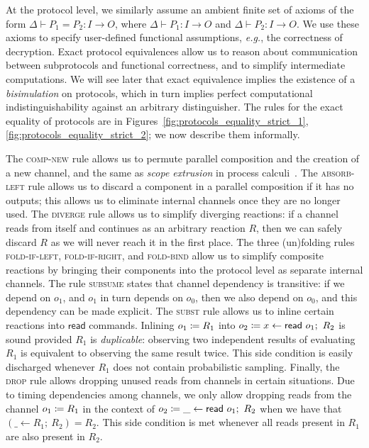 At the protocol level, we similarly assume an ambient finite set of axioms of the form $\Delta \vdash P_1 = P_2 : I \to O$, where $\Delta \vdash P_1 : I \to O$ and $\Delta \vdash P_2 : I \to O$. We use these axioms to specify user-defined functional assumptions, \emph{e.g.}, the correctness of decryption. Exact protocol equivalences allow us to reason about communication between subprotocols and functional correctness, and to simplify intermediate computations. We will see later that exact equivalence implies the existence of a \emph{bisimulation} on protocols, which in turn implies perfect computational indistinguishability against an arbitrary distinguisher. The rules for the exact equality of protocols are in Figures~\ref{fig:protocols_equality_strict_1}, \ref{fig:protocols_equality_strict_2}; we now describe them informally.

The \textsc{comp-new} rule allows us to permute parallel composition and the creation of a new channel, and the same as \emph{scope
extrusion} in process calculi~\cite{picalc}. The \textsc{absorb-left} 
rule allows us to discard a component in a parallel composition if it has no outputs; this allows us to eliminate internal channels once they are no longer used. The \textsc{diverge} rule allows us to simplify diverging reactions: if a channel reads from itself and continues as an arbitrary reaction $R$, then we can safely discard $R$ as we will never reach it in the first place. The three (un)folding rules \textsc{fold-if-left}, \textsc{fold-if-right}, and \textsc{fold-bind} allow us to simplify composite reactions by bringing their
components into the protocol level as separate internal channels. The rule \textsc{subsume} states that channel dependency is transitive: if we depend on $o_1$, and $o_1$ in turn depends on $o_0$, then we also depend on $o_0$, and this dependency can be made explicit. The \textsc{subst} rule allows us to inline certain reactions into $\mathsf{read}$ commands. Inlining $o_1 \coloneqq R_1$ into $\assign{o_2}{x \leftarrow \read{o_1}; \ R_2}$ is sound provided $R_1$ is \emph{duplicable}: observing two independent results of evaluating $R_1$ is equivalent to observing the same result twice. This side condition is easily discharged whenever $R_1$ does not contain probabilistic
sampling. Finally, the \textsc{drop} rule allows dropping unused reads from channels in certain situations. Due to timing dependencies among channels, we only allow dropping reads from the channel $o_1 \coloneqq R_1$ in the context of $\assign{o_2}{\_ \leftarrow \read{o_1};\ R_2}$ when we have that $(\_ \leftarrow R_1; \ R_2) = R_2$. This side condition is met whenever all reads present in $R_1$ are also present in $R_2$.

